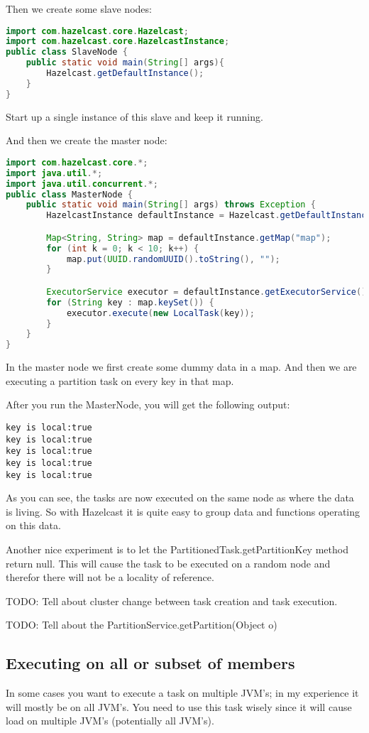 Then we create some slave nodes:
\begin{lstlisting}[language=java]
import com.hazelcast.core.Hazelcast;
import com.hazelcast.core.HazelcastInstance;
public class SlaveNode {
    public static void main(String[] args){
        Hazelcast.getDefaultInstance();
    }
}
\end{lstlisting}
Start up a single instance of this slave and keep it running.

And then we create the master node:
\begin{lstlisting}[language=java]
import com.hazelcast.core.*;
import java.util.*;
import java.util.concurrent.*;
public class MasterNode {
    public static void main(String[] args) throws Exception {
        HazelcastInstance defaultInstance = Hazelcast.getDefaultInstance();

        Map<String, String> map = defaultInstance.getMap("map");
        for (int k = 0; k < 10; k++) {
            map.put(UUID.randomUUID().toString(), "");
        }

        ExecutorService executor = defaultInstance.getExecutorService();
        for (String key : map.keySet()) {
            executor.execute(new LocalTask(key));
        }
    }
}
\end{lstlisting}
In the master node we first create some dummy data in a map. And then we are executing a partition task on every key in that map. 

After you run the MasterNode, you will get the following output:
\begin{verbatim}
key is local:true
key is local:true
key is local:true
key is local:true
key is local:true
\end{verbatim}
As you can see, the tasks are now executed on the same node as where the data is living. So with Hazelcast it is quite easy to group data and functions operating on this data. 

Another nice experiment is to let the PartitionedTask.getPartitionKey method return null. This will cause the task to be executed on a random node and therefor there will not be a locality of reference.

TODO: Tell about cluster change between task creation and task execution.

TODO: Tell about the PartitionService.getPartition(Object o)

\subsection{Executing on all or subset of members}
In some cases you want to execute a task on multiple JVM's; in my experience it will mostly be on all JVM's. You need to use this task wisely since it will cause load on multiple JVM's (potentially all JVM's).


